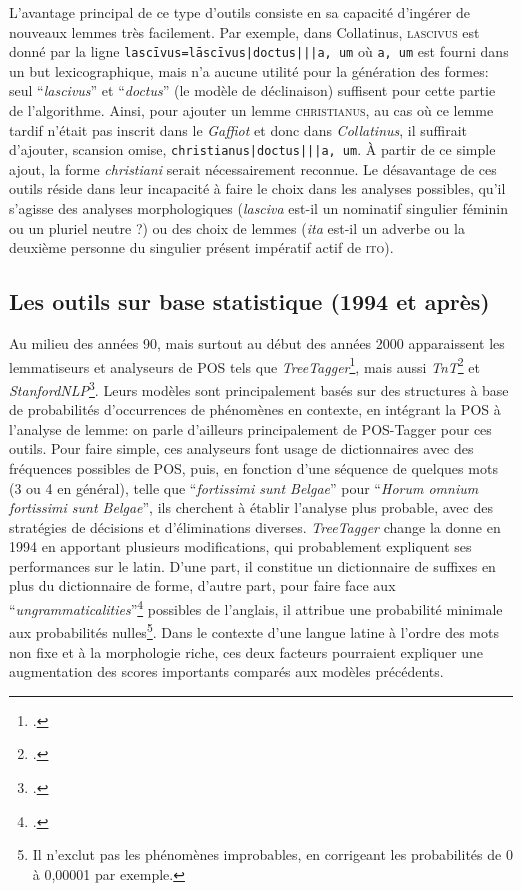 L'avantage principal de ce type d'outils consiste en sa capacité d'ingérer de nouveaux lemmes très facilement. Par exemple, dans Collatinus, \textsc{lascivus} est donné par la ligne \texttt{lascīvus=lāscīvus|doctus|||a, um} où \texttt{a, um} est fourni dans un but lexicographique, mais n'a aucune utilité pour la génération des formes: seul \enquote{\textit{lascivus}} et \enquote{\textit{doctus}} (le modèle de déclinaison) suffisent pour cette partie de l'algorithme. Ainsi, pour ajouter un lemme \textsc{christianus}, au cas où ce lemme tardif n'était pas inscrit dans le \textit{Gaffiot} et donc dans \textit{Collatinus}, il suffirait d'ajouter, scansion omise, \texttt{christianus|doctus|||a, um}. À partir de ce simple ajout, la forme \textit{christiani} serait nécessairement reconnue. Le désavantage de ces outils réside dans leur incapacité à faire le choix dans les analyses possibles, qu'il s'agisse des analyses morphologiques (\textit{lasciva} est-il un nominatif singulier féminin ou un pluriel neutre ?) ou des choix de lemmes (\textit{ita} est-il un adverbe ou la deuxième personne du singulier présent impératif actif de \textsc{ito}).

\subsection{Les outils sur base statistique (1994 et après)}

Au milieu des années 90, mais surtout au début des années 2000 apparaissent les lemmatiseurs et analyseurs de POS tels que \textit{TreeTagger}\footcite{schmid1994treetagger}, mais aussi \textit{TnT}\footcite{brants_tnt_2000} et \textit{StanfordNLP}\footcite{toutanova_feature-rich_2003}. Leurs modèles sont principalement basés sur des structures à base de probabilités d'occurrences de phénomènes en contexte, en intégrant la POS à l'analyse de lemme: on parle d'ailleurs principalement de POS-Tagger pour ces outils. Pour faire simple, ces analyseurs font usage de dictionnaires avec des fréquences possibles de POS, puis, en fonction d'une séquence de quelques mots (3 ou 4 en général), telle que \enquote{\textit{fortissimi sunt Belgae}} pour \enquote{\textit{Horum omnium fortissimi sunt Belgae}}, ils cherchent à établir l'analyse plus probable, avec des stratégies de décisions et d'éliminations diverses. \textit{TreeTagger} change la donne en 1994 en apportant plusieurs modifications, qui probablement expliquent ses performances sur le latin. D'une part, il constitue un dictionnaire de suffixes en plus du dictionnaire de forme, d'autre part, pour faire face aux \enquote{\textit{ungrammaticalities}}\footcite[p.~2]{schmid1994treetagger} possibles de l'anglais, il attribue une probabilité minimale aux probabilités nulles\footnote{Il n'exclut pas les phénomènes improbables, en corrigeant les probabilités de 0 à 0,00001 par exemple.}. Dans le contexte d'une langue latine à l'ordre des mots non fixe et à la morphologie riche, ces deux facteurs pourraient expliquer une augmentation des scores importants comparés aux modèles précédents.

